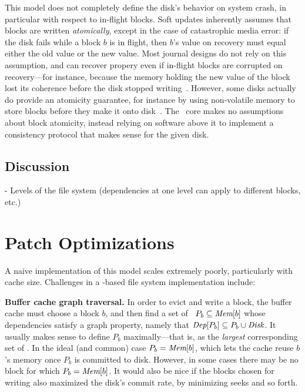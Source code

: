 This model does not completely define the disk's behavior on system crash,
 in particular with respect to in-flight blocks.
%
Soft updates inherently assumes that blocks are written
\emph{atomically}, except in the case of catastrophic media error:
%
if the disk fails while a block $b$ is in flight, then $b$'s
value on recovery must equal either the old value or the new value.
%
Most journal designs do not rely on this assumption, and can recover
 propery even if in-flight blocks are corrupted on recovery---for instance,
 because the memory holding the new value of the block lost its coherence
 before the disk stopped writing~\cite{tso}.
%
However, some disks actually do provide an atomicity guarantee, for
 instance by using non-volatile memory to store blocks before they make it
 onto disk~\cite{???}.
%
The \Kudos\ core makes no assumptions about block atomicity, instead relying
 on software above it to implement a consistency protocol that makes sense
 for the given disk.






\subsection{Discussion}

- Levels of the file system (dependencies at one level can apply to
  different blocks, etc.)



\section{Patch Optimizations}
\label{sec:patch:challenges}

A naive implementation of this model scales extremely poorly,
particularly with cache size.
%
Challenges in a \patch-based file system implementation include:

\textbf{Buffer cache graph traversal.}
%
In order to evict and write a block, the buffer cache must choose a block
$b$,
%
and then find a set of \patches\ $P_b \subseteq \PMem[b]$ whose dependencies
satisfy a graph property, namely that $\PDepset{P_b} \subseteq P_b \cup
\PDisk$.
%
It usually makes sense to define $P_b$ maximally---that is, as the
\emph{largest} corresponding set of \patches.
%
In the ideal (and common) case $P_b = \PMem[b]$, which lets the cache reuse
$b$'s memory once $P_b$ is committed to disk.  However, in some cases there
may be no block for which $P_b = \PMem[b]$.
%
It would also be nice if the blocks chosen for writing also maximized the
disk's commit rate, by minimizing seeks and so forth.

